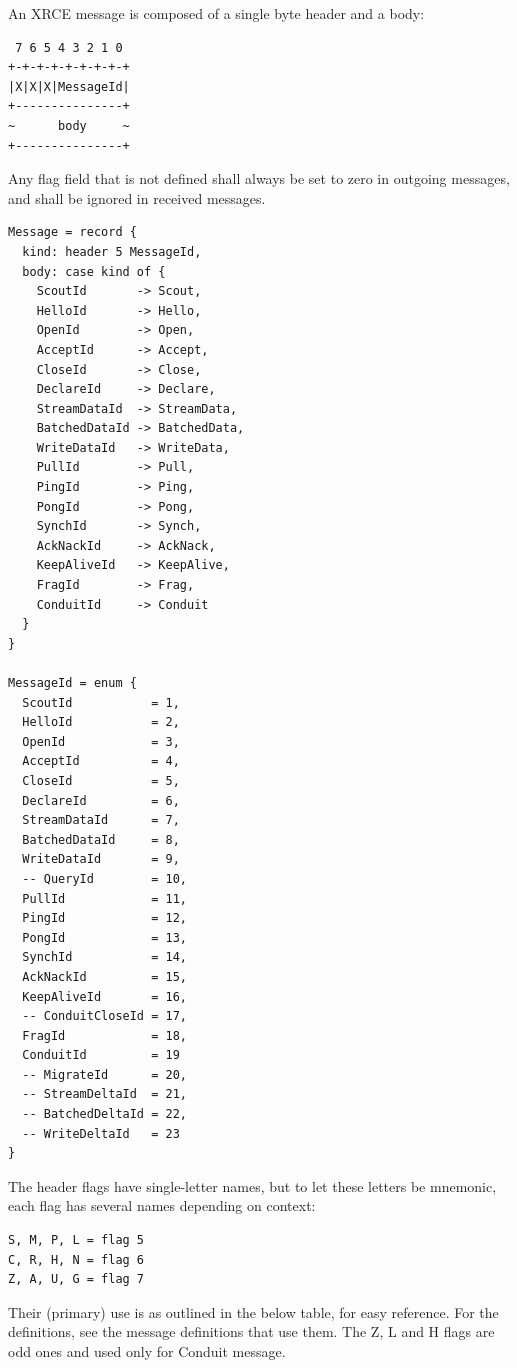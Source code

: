 \documentclass[a4paper,oneside,article]{memoir}
\begin{document}
An XRCE message is composed of a single byte header and a body:
\begin{verbatim}
 7 6 5 4 3 2 1 0
+-+-+-+-+-+-+-+-+
|X|X|X|MessageId|
+---------------+
~      body     ~
+---------------+
\end{verbatim}
Any flag field that is not defined shall always be set to zero in outgoing messages, and shall be
ignored in received messages.
\begin{verbatim}
Message = record {
  kind: header 5 MessageId,
  body: case kind of {
    ScoutId       -> Scout,
    HelloId       -> Hello,
    OpenId        -> Open,
    AcceptId      -> Accept,
    CloseId       -> Close,
    DeclareId     -> Declare,
    StreamDataId  -> StreamData,
    BatchedDataId -> BatchedData,
    WriteDataId   -> WriteData,
    PullId        -> Pull,
    PingId        -> Ping,
    PongId        -> Pong,
    SynchId       -> Synch,
    AckNackId     -> AckNack,
    KeepAliveId   -> KeepAlive,
    FragId        -> Frag,
    ConduitId     -> Conduit
  }
}

MessageId = enum {
  ScoutId           = 1,
  HelloId           = 2,
  OpenId            = 3,
  AcceptId          = 4,
  CloseId           = 5,
  DeclareId         = 6,
  StreamDataId      = 7,
  BatchedDataId     = 8,
  WriteDataId       = 9,
  -- QueryId        = 10,
  PullId            = 11,
  PingId            = 12,
  PongId            = 13,
  SynchId           = 14,
  AckNackId         = 15,
  KeepAliveId       = 16,
  -- ConduitCloseId = 17,
  FragId            = 18,
  ConduitId         = 19
  -- MigrateId      = 20,
  -- StreamDeltaId  = 21,
  -- BatchedDeltaId = 22,
  -- WriteDeltaId   = 23
}
\end{verbatim}

The header flags have single-letter names, but to let these letters be mnemonic, each flag has
several names depending on context:
\begin{verbatim}
S, M, P, L = flag 5
C, R, H, N = flag 6
Z, A, U, G = flag 7
\end{verbatim}

Their (primary) use is as outlined in the below table, for easy reference.  For the definitions, see
the message definitions that use them.  The Z, L and H flags are odd ones and used only for Conduit
message.
\end{document}
